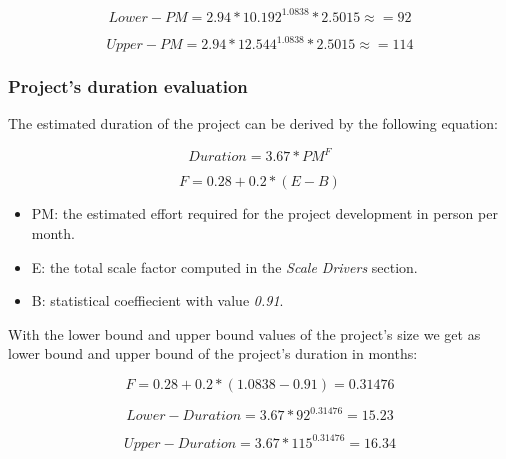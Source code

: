 \begin{displaymath}
        Lower-PM = 2.94 * 10.192^{1.0838} * 2.5015 \approx = 92 
\end{displaymath}

\begin{displaymath}
       Upper-PM = 2.94 * 12.544^{1.0838} * 2.5015 \approx = 114
\end{displaymath}

\subsubsection{Project's duration evaluation}

The estimated duration of the project can be derived by the following equation:

\begin{equation}
        Duration = 3.67 * PM^{F} 
\end{equation}

\begin{equation}
        F = 0.28 + 0.2 * (E - B)
\end{equation} 

\begin{itemize}
        \item PM: the estimated effort required for the project development in person per month.
	\item E: the total scale factor computed in the \textit{Scale Drivers} section.
	\item B: statistical coeffiecient with value \textit{0.91}.
\end{itemize}

With the lower bound and upper bound values of the project's size we get as lower bound and upper bound of the project's duration in months:

\begin{displaymath}
        F = 0.28 + 0.2 * (1.0838 - 0.91) = 0.31476
\end{displaymath}

\begin{displaymath}
        Lower-Duration = 3.67 * 92^{0.31476} = 15.23
\end{displaymath}

\begin{displaymath}
        Upper-Duration = 3.67 * 115^{0.31476} = 16.34
\end{displaymath}

